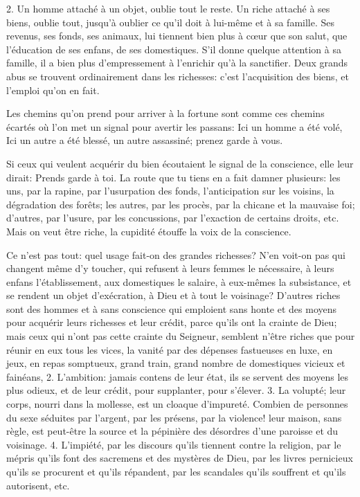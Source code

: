\documentclass[instructions.tex]{subfiles}
\begin{document}
2. Un homme attaché à un objet, oublie tout le reste. Un riche attaché à ses biens, oublie tout, jusqu’à oublier ce qu’il doit à lui-même et à sa famille. Ses revenus, ses fonds, ses animaux, lui tiennent bien plus à cœur que son salut, que l’éducation de ses enfans, de ses domestiques. S’il donne quelque attention à sa famille, il a bien plus d’empressement à l’enrichir qu’à la sanctifier. Deux grands abus se trouvent ordinairement dans les richesses: c’est l’acquisition des biens, et l’emploi qu’on en fait.
 
Les chemins qu’on prend pour arriver à la fortune sont comme ces chemins écartés où l’on met un signal pour avertir les passans: Ici un homme a été volé, Ici un autre a été blessé, un autre assassiné; prenez garde à vous.
 
Si ceux qui veulent acquérir du bien écoutaient le signal de la conscience, elle leur dirait: Prends garde à toi. La route que tu tiens en a fait damner plusieurs: les uns, par la rapine, par l’usurpation des fonds, l’anticipation sur les voisins, la dégradation des forêts; les autres, par les procès, par la chicane et la mauvaise foi; d’autres, par l’usure, par les concussions, par l’exaction de certains droits, etc. Mais on veut être riche, la cupidité étouffe la voix de la conscience.
 
Ce n’est pas tout: quel usage fait-on des grandes richesses? N’en voit-on pas qui changent même d’y toucher, qui refusent à leurs femmes le nécessaire, à leurs enfans l’établissement, aux domestiques le salaire, à eux-mêmes la subsistance, et se rendent un objet d’exécration, à Dieu et à tout le voisinage? D’autres riches sont des hommes et à sans conscience qui emploient sans honte et des moyens pour acquérir leurs richesses et leur crédit, parce qu’ils ont la crainte de Dieu; mais ceux qui n’ont pas cette crainte du Seigneur, semblent n’être riches que pour réunir en eux tous les vices, la vanité par des dépenses fastueuses en luxe, en jeux, en repas somptueux, grand train, grand nombre de domestiques vicieux et fainéans, 2. L’ambition: jamais contens de leur état, ils se servent des moyens les plus odieux, et de leur crédit, pour supplanter, pour s’élever. 3. La volupté; leur corps, nourri dans la mollesse, est un cloaque d’impureté. Combien de personnes du sexe séduites par l’argent, par les présens, par la violence! leur maison, sans règle, est peut-être la source et la pépinière des désordres d’une paroisse et du voisinage. 4. L’impiété, par les discours qu’ils tiennent contre la religion, par le mépris qu’ils font des sacremens et des mystères de Dieu, par les livres pernicieux qu’ils se procurent et qu’ils répandent, par les scandales qu’ils souffrent et qu’ils autorisent, etc.
 
\end{document}
